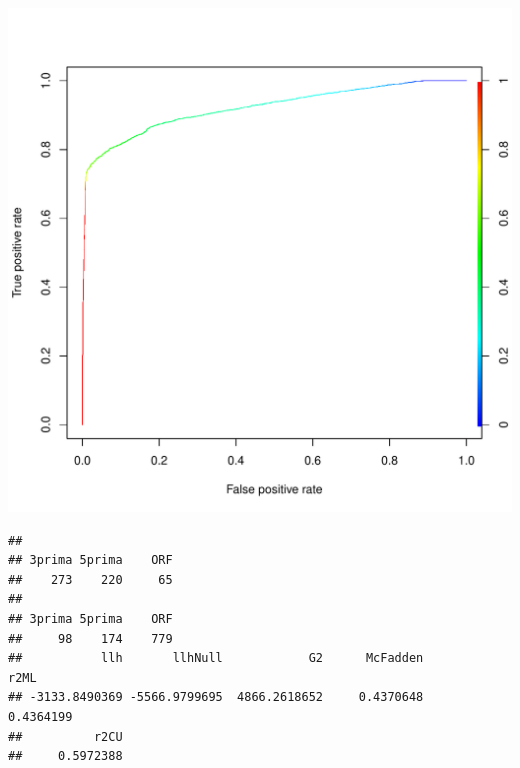 \documentclass{article}\usepackage[]{graphicx}\usepackage[]{color}
\makeatletter
\def\maxwidth{ %
  \ifdim\Gin@nat@width>\linewidth
    \linewidth
  \else
    \Gin@nat@width
  \fi
}
\newenvironment{kframe}{%
 \def\at@end@of@kframe{}%
 \ifinner\ifhmode%
  \def\at@end@of@kframe{\end{minipage}}%
  \begin{minipage}{\columnwidth}%
 \fi\fi%
 \def\FrameCommand##1{\hskip\@totalleftmargin \hskip-\fboxsep
 \colorbox{shadecolor}{##1}\hskip-\fboxsep
     \hskip-\linewidth \hskip-\@totalleftmargin \hskip\columnwidth}%
 \MakeFramed {\advance\hsize-\width
   \@totalleftmargin\z@ \linewidth\hsize
   \@setminipage}}%
 {\par\unskip\endMakeFramed%
 \at@end@of@kframe}
\newenvironment{knitrout}{}{} %
\makeatother
\begin{document}
\begin{knitrout}
\begin{kframe}
{\ttfamily\noindent\itshape\color{messagecolor}{\#\# The following object is masked from 'package:stats':\\\#\# \\\#\#\ \ \ \  lowess}}\end{kframe}
\includegraphics[width=\maxwidth]{figure/model-1} 
\begin{kframe}\begin{verbatim}
## 
## 3prima 5prima    ORF 
##    273    220     65
## 
## 3prima 5prima    ORF 
##     98    174    779
##           llh       llhNull            G2      McFadden          r2ML 
## -3133.8490369 -5566.9799695  4866.2618652     0.4370648     0.4364199 
##          r2CU 
##     0.5972388
\end{verbatim}
\end{kframe}
\end{knitrout}
\end{document}
